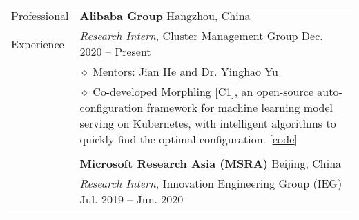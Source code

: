 \documentclass[letterpaper, 11pt]{article}
\begin{document}
\begin{longtable}{p{1in}p{5in}}
{Professional}
& {\textbf{Alibaba Group}} \hfill Hangzhou, China \\
{Experience}
& \textit{Research Intern}, Cluster Management Group \hfill Dec. 2020 -- Present \\
& $\diamond$ Mentors: \href{https://www.linkedin.com/in/jian-he-2309aa34/}{\underline{Jian He}} and \href{https://scholar.google.com/citations?user=_YgjRn0AAAAJ&hl=en}{\underline{Dr. Yinghao Yu}} \\
& $\diamond$ Co-developed Morphling [C1], an open-source auto-configuration framework for machine learning model serving on Kubernetes, with intelligent algorithms to quickly find the optimal configuration. 
[\href{https://github.com/kubedl-io/morphling}{\underline{code}}] \\
& \\

 
& {\textbf{Microsoft Research Asia (MSRA)}} \hfill Beijing, China\\
& \textit{Research Intern}, Innovation Engineering Group (IEG) \hfill Jul. 2019 -- Jun. 2020 \\
& \\


\end{longtable}
\end{document}
